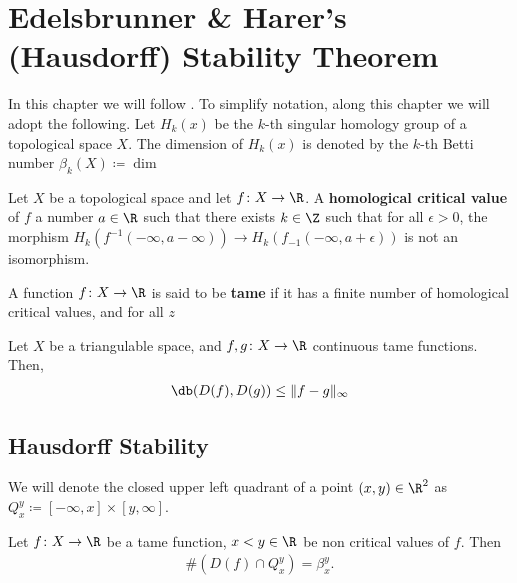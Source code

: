 \chapter{Edelsbrunner \& Harer's (Hausdorff) Stability Theorem}

In this chapter we will follow \cite{Edelsbrunner}. To simplify notation, along this chapter we will adopt the following. Let $ H_k(x) $ be the $k$-th singular homology group of a topological space $ X $. The dimension of $ H_k(x) $ is denoted by the $k$-th Betti number $ \beta_k(X) \coloneq \dim $


\begin{definition}
    Let $ X $ be a topological space and let $ f\colon X \to \R $. A {\bf homological critical value} of $ f $ a number $ a \in \R $ such that there exists $k \in \Z$ such that for all 
    $ \epsilon > 0 $, the morphism $ H_k(f^{-1}(-\infty, a - \infty)) \to H_k(f_{-1}(-\infty, a + \epsilon)) $ is not an isomorphism.
\end{definition}

\begin{definition}
    A function $ f\colon X \to \R $ is said to be {\bf tame} if it has a finite number of homological critical values, and for all $ z$
\end{definition}

\begin{theorem} \label{lemma:edelsbrunner-stability}
    Let $ X $ be a triangulable space, and $ f, g\colon X \to \R $ continuous tame functions. Then,
    \begin{align}
        \db (D(f), D(g)) \leq \|f-g\|_\infty
    \end{align}
\end{theorem}

\section{Hausdorff Stability}

We will denote the closed upper left quadrant of a point $ (x, y) \in \R^2 $ as $ Q_x^y \coloneq [-\infty, x] \times [y, \infty] $.

\begin{lemma} \label{lemma:k-triangle}
    Let $ f\colon X \to \R $ be a tame function, $ x < y \in \R $ be non critical values of $ f $. Then
    \begin{align}
        \# (D(f) \cap Q_x^y) = \beta_x^y.
    \end{align}
\end{lemma}

